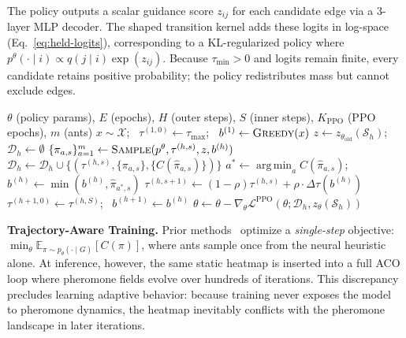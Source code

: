 \documentclass[sigconf]{acmart}
\DeclareMathOperator*{\argmin}{arg\,min}
\newcommand{\DyNACO}{\textsc{DyNACO}}
\begin{document}
The policy outputs a scalar guidance score $z_{ij}$ for each candidate edge via a 3-layer MLP decoder.
The shaped transition kernel adds these logits in log-space (Eq.~\ref{eq:held-logits}), corresponding to a KL-regularized policy where $p^\theta(\cdot\mid i) \propto q(j\mid i)\exp(z_{ij})$.
Because $\tau_{\min} > 0$ and logits remain finite, every candidate retains positive probability; the policy redistributes mass but cannot exclude edges.
\begin{algorithm}[t]
\caption{PPO training for \DyNACO{}.}
\label{alg:train}
\begin{algorithmic}[1]
\REQUIRE $\theta$ (policy params), $E$ (epochs), $H$ (outer steps), $S$ (inner steps), $K_{\text{PPO}}$ (PPO epochs), $m$ (ants)
    \STATE $x \sim \mathcal{X}$; \, $\tau^{(1,0)} \gets \tau_{\max}$; \, $b^{(1)} \gets \textsc{Greedy}(x)$
        \STATE $z \gets z_{\theta_{\text{old}}}(\mathcal{S}_h)$; \, $\mathcal{D}_h \gets \emptyset$
            \STATE $\{\pi_{a,s}\}_{a=1}^m \gets \textsc{Sample}(p^\theta, \tau^{(h,s)}, z, b^{(h)})$
            \STATE $\mathcal{D}_h \gets \mathcal{D}_h \cup \{(\tau^{(h,s)}, \{\pi_{a,s}\}, \{C(\hat{\pi}_{a,s})\})\}$
            \STATE $a^* \gets \argmin_a C(\hat{\pi}_{a,s})$; \, $b^{(h)} \gets \min(b^{(h)}, \hat{\pi}_{a^*,s})$
            \STATE $\tau^{(h,s+1)} \gets (1{-}\rho)\tau^{(h,s)} + \rho \cdot \Delta\tau(b^{(h)})$
        \ENDFOR
        \STATE $\tau^{(h+1,0)} \gets \tau^{(h,S)}$; \, $b^{(h+1)} \gets b^{(h)}$
            \STATE $\theta \gets \theta - \nabla_\theta \mathcal{L}^{\text{PPO}}(\theta; \mathcal{D}_h, z_\theta(\mathcal{S}_h))$
        \ENDFOR
    \ENDFOR
\ENDFOR
\end{algorithmic}
\end{algorithm}



\smallskip\noindent\textbf{Trajectory-Aware Training.}
\label{sec:training}
Prior methods~\cite{deepaco,gfacs,gtgaco} optimize a \emph{single-step} objective: $\min_\theta \mathbb{E}_{\pi \sim p_\theta(\cdot \mid G)} [ C(\pi) ]$, where ants sample once from the neural heuristic alone.
At inference, however, the same static heatmap is inserted into a full ACO loop where pheromone fields evolve over hundreds of iterations.
This discrepancy precludes learning adaptive behavior: because training never exposes the model to pheromone dynamics, the heatmap inevitably conflicts with the pheromone landscape in later iterations.
\end{document}
